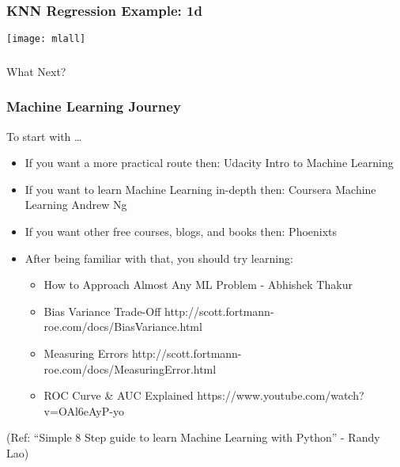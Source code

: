 \begin{frame}[fragile]\frametitle{KNN Regression Example: 1d}
\begin{center}
\texttt{[image: mlall]}
\end{center}
\end{frame}

\begin{frame}[fragile]\frametitle{}
\begin{center}
{\Large What Next?}
\end{center}
\end{frame}

\begin{frame}\frametitle{Machine Learning Journey}
To start with \ldots

\footnotesize
\begin{itemize}
\item If you want a more practical route then: Udacity Intro to Machine Learning
\item If you want to learn Machine Learning in-depth then: Coursera Machine Learning Andrew Ng
\item  If you want other free courses, blogs, and books then: Phoenixts
\item  After being familiar with that, you should try learning:
\begin{itemize}
\item  How to Approach Almost Any ML Problem - Abhishek Thakur
\item  Bias Variance Trade-Off
http://scott.fortmann-roe.com/docs/BiasVariance.html
\item  Measuring Errors
http://scott.fortmann-roe.com/docs/MeasuringError.html
\item  ROC Curve \& AUC Explained
https://www.youtube.com/watch?v=OAl6eAyP-yo
\end{itemize}
\end{itemize}

(Ref: ``Simple 8 Step guide to learn Machine Learning with Python'' - Randy Lao)
\end{frame}

